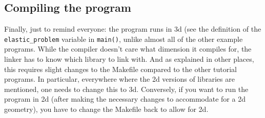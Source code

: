 \documentclass{article}
\begin{document}
\subsection*{Compiling the program}

Finally, just to remind everyone: the program runs in 3d (see the definition
of the \texttt{elastic\_problem} variable in \texttt{main()}, unlike almost all
of the other example programs. While the compiler doesn't care what dimension
it compiles for, the linker has to know which library to link with. And as
explained in other places, this requires slight changes to the Makefile
compared to the other tutorial programs. In particular, everywhere where the
2d versions of libraries are mentioned, one needs to change this to
3d. Conversely, if you want to run the program in 2d (after making the
necessary changes to accommodate for a 2d geometry), you have to change the
Makefile back to allow for 2d.
\end{document}
